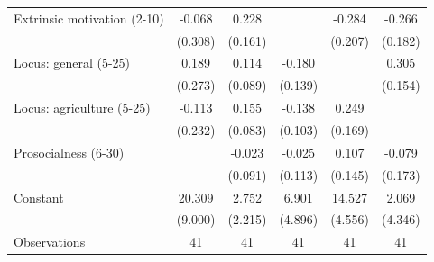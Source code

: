 {\begin{tabular}{l*{5}{c}}
Extrinsic motivation (2-10)&-0.068         &0.228         &              &-0.284         &-0.266         \\
                    &(0.308)         &(0.161)         &              &(0.207)         &(0.182)         \\
Locus: general (5-25)&0.189         &0.114         &-0.180         &              &0.305\sym{*}  \\
                    &(0.273)         &(0.089)         &(0.139)         &              &(0.154)         \\
Locus: agriculture (5-25)&-0.113         &0.155\sym{*}  &-0.138         &0.249         &              \\
                    &(0.232)         &(0.083)         &(0.103)         &(0.169)         &              \\
Prosocialness (6-30)&              &-0.023         &-0.025         &0.107         &-0.079         \\
                    &              &(0.091)         &(0.113)         &(0.145)         &(0.173)         \\
Constant            &20.309\sym{**} &2.752         &6.901         &14.527\sym{***}&2.069         \\
                    &(9.000)         &(2.215)         &(4.896)         &(4.556)         &(4.346)         \\
\hline
Observations        &   41         &   41         &   41         &   41         &   41         \\
\hline\hline
\end{tabular}
}
